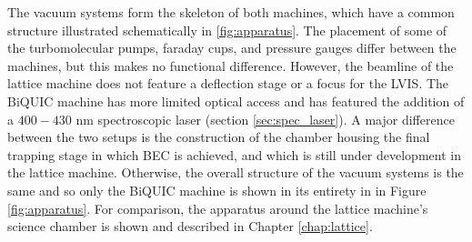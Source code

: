 	The vacuum systems form the skeleton of both machines, which have a common structure illustrated schematically in \ref{fig:apparatus}.
	The placement of some of the turbomolecular pumps, faraday cups, and pressure gauges differ between the machines, but this makes no functional difference.
	However, the beamline of the lattice machine does not feature a deflection stage or a focus for the LVIS.
	The BiQUIC machine has more limited optical access and has featured the addition of a $400-430$ nm spectroscopic laser (section \ref{sec:spec_laser}).
	A major difference between the two setups is the construction of the chamber housing the final trapping stage in which BEC is achieved, and which is still under development in the lattice machine.
	Otherwise, the overall structure of the vacuum systems is the same and so only the BiQUIC machine is shown in its entirety in in Figure \ref{fig:apparatus}.
	For comparison, the apparatus around the lattice machine's science chamber is shown and described in Chapter \ref{chap:lattice}.

